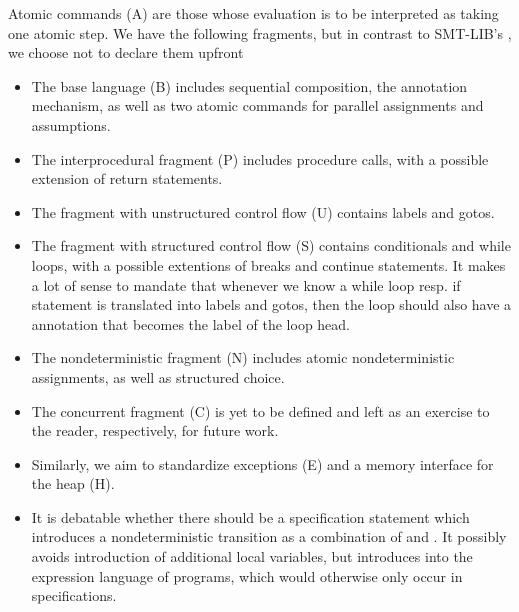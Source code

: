 \documentclass[runningheads]{llncs}
\begin{document}
\noindent
Atomic commands (A) are those whose evaluation is to be interpreted
as taking one atomic step.
We have the following fragments, but in contrast to SMT-LIB's ,
we choose not to declare them upfront
\begin{itemize}
\item The base language (B) includes sequential composition,
      the annotation mechanism,
      as well as two atomic commands for
      parallel assignments and assumptions.
\item The interprocedural fragment (P) includes procedure calls,
      with a possible extension of return statements.
\item The fragment with unstructured control flow (U)
      contains labels and gotos.
\item The fragment with structured control flow (S)
      contains conditionals and while loops,
      with a possible extentions of breaks and continue statements.
      It makes a lot of sense to mandate that whenever
      we know a while loop resp. if statement is translated into labels and gotos,
      then the loop should also have a  annotation
      that becomes the label of the loop head.
\item The nondeterministic fragment (N)
      includes atomic nondeterministic assignments,
      as well as structured choice.
\item The concurrent fragment (C) is yet to be defined
      and left as an exercise to the reader, respectively,
      for future work.
\item Similarly, we aim to standardize exceptions (E) and a memory interface for the heap (H).
\item It is debatable whether there should be a specification statement
      which introduces a nondeterministic transition as a combination
      of  and .
      It possibly avoids introduction of additional local variables,
      but introduces  into the expression language of programs,
      which would otherwise only occur in specifications.
\end{itemize}
\end{document}
